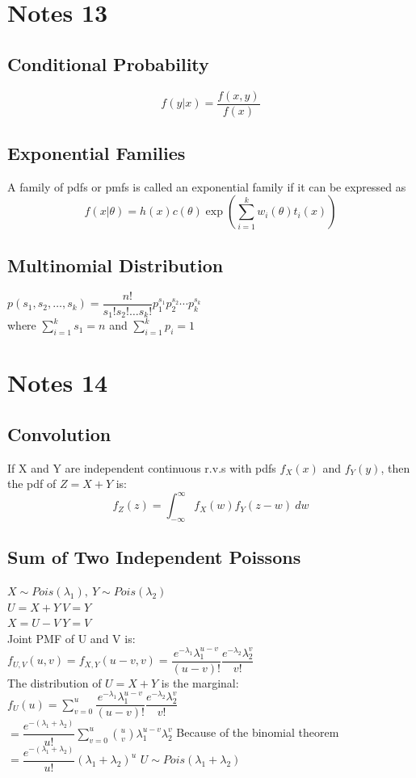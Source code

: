 \documentclass[openany]{book}
\begin{document}
\chapter{Notes 13}
\section{Conditional Probability}
\[f(y|x)=\dfrac{f(x,y)}{f(x)}
\]
\section{Exponential Families}
A family of pdfs or pmfs is called an exponential family if it can be expressed as
\[f(x|\theta)=h(x)c(\theta)\exp\left(\sum_{i=1}^{k}w_i(\theta)t_i(x)\right)
\]
\section{Multinomial Distribution}
$p(s_1,s_2,\dots,s_k)=\dfrac{n!}{s_1!s_2!\dots s_k!}p_1^{s_1}p_2^{s_2}\cdots p_k^{s_k}$\\
where $\sum_{i=1}^{k}s_1=n$ and $\sum_{i=1}^{k}p_i=1$\\

\chapter{Notes 14}
\section{Convolution}
If X and Y are independent continuous r.v.s with pdfs $f_X(x)$ and $f_Y(y)$, then the pdf of $Z=X+Y$ is:
\[f_Z(z)=\int_{-\infty}^{\infty}f_X(w)f_Y(z-w)\ dw
\]
\section{Sum of Two Independent Poissons}
$X\sim Pois(\lambda_1), \ Y\sim Pois(\lambda_2)$\\
$U=X+Y \ V=Y$\\
$X=U-V \ Y=V$\\
Joint PMF of U and V is:\\
$f_{U,V}(u,v)=f_{X,Y}(u-v,v)=\dfrac{e^{-\lambda_1}\lambda_1^{u-v}}{(u-v)!}\dfrac{e^{-\lambda_2}\lambda_2^v}{v!}$\\
The distribution of $U=X+Y$ is the marginal:\\
$f_U(u)=\sum_{v=0}^{u}\dfrac{e^{-\lambda_1}\lambda_1^{u-v}}{(u-v)!}\dfrac{e^{-\lambda_2}\lambda_2^v}{v!}$\\
$=\dfrac{e^{-(\lambda_1+\lambda_2)}}{u!}\sum_{v=0}^{u} {u \choose v}\lambda_1^{u-v}\lambda_2^v$\medbreak
Because of the binomial theorem\medbreak
$=\dfrac{e^{-(\lambda_1+\lambda_2)}}{u!}(\lambda_1+\lambda_2)^u$\medbreak
$U\sim Pois(\lambda_1+\lambda_2)$
\end{document}
